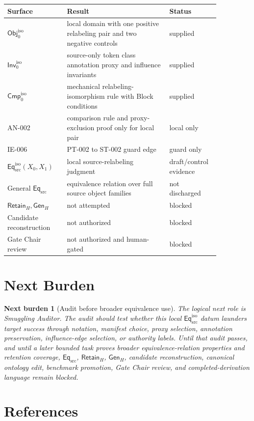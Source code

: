 \documentclass[11pt]{article}
\newcommand{\Obj}{\mathsf{Obj}_{0}^{\mathrm{iso}}}
\newcommand{\Inv}{\mathsf{Inv}_{0}^{\mathrm{iso}}}
\newcommand{\Cmp}{\mathsf{Cmp}_{0}^{\mathrm{iso}}}
\newcommand{\EqSrc}{\mathsf{Eq}_{\mathrm{src}}}
\newcommand{\EqIso}{\mathsf{Eq}_{\mathrm{src}}^{\mathrm{iso}}}
\newcommand{\GenH}{\mathsf{Gen}_{H}}
\newcommand{\RetainH}{\mathsf{Retain}_{H}}
\newtheorem{nextburden}{Next burden}
\begin{document}
\begin{center}
\begin{tabular}{p{0.25\linewidth}p{0.43\linewidth}p{0.18\linewidth}}
\textbf{Surface} & \textbf{Result} & \textbf{Status} \\
\hline
\(\Obj\) & local domain with one positive relabeling pair and two negative controls & supplied \\
\(\Inv\) & source-only token class annotation proxy and influence invariants & supplied \\
\(\Cmp\) & mechanical relabeling-isomorphism rule with Block conditions & supplied \\
AN-002 & comparison rule and proxy-exclusion proof only for local pair & local only \\
IE-006 & PT-002 to ST-002 guard edge & guard only \\
\(\EqIso(X_{0},X_{1})\) & local source-relabeling judgment & draft/control evidence \\
General \(\EqSrc\) & equivalence relation over full source object families & not discharged \\
\(\RetainH,\GenH\) & not attempted & blocked \\
Candidate reconstruction & not authorized & blocked \\
Gate Chair review & not authorized and human-gated & blocked \\
\end{tabular}
\end{center}

\section{Next Burden}

\begin{nextburden}[Audit before broader equivalence use]
The logical next role is Smuggling Auditor. The audit should test whether
this local \(\EqIso\) datum launders target success through notation,
manifest choice, proxy selection, annotation preservation, influence-edge
selection, or authority labels. Until that audit passes, and until a later
bounded task proves broader equivalence-relation properties and retention
coverage, \(\EqSrc\), \(\RetainH\), \(\GenH\), candidate reconstruction,
canonical ontology edit, benchmark promotion, Gate Chair review, and
completed-derivation language remain blocked.
\end{nextburden}

\section*{References}
\end{document}
